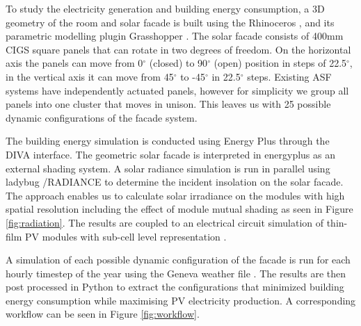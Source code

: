 
To study the electricity generation and building energy consumption, a 3D geometry of the room and solar facade is built using the Rhinoceros \cite{Rhino}, and its parametric modelling plugin Grasshopper \cite{grasshopper}. The solar facade consists of 400mm CIGS square panels that can rotate in two degrees of freedom. On the horizontal axis the panels can move from 0$^{\circ}$ (closed) to 90$^{\circ}$ (open) position in steps of 22.5$^{\circ}$, in the vertical axis it can move from 45$^{\circ}$ to -45$^{\circ}$ in 22.5$^{\circ}$ steps. Existing ASF systems \cite{nagy2015frontiers} have independently actuated panels, however for simplicity we group all panels into one cluster that moves in unison. This leaves us with 25 possible dynamic configurations of the facade system. 

The building energy simulation is conducted using Energy Plus \cite{energyplus} through the DIVA \cite{DIVA} interface. The geometric solar facade is interpreted in energyplus as an external shading system. A solar radiance simulation is run in parallel using ladybug \cite{roudsari2014ladybug} /RADIANCE \cite{ward1994radiance} to determine the incident insolation on the solar facade. The approach enables us to calculate solar irradiance on the modules with high spatial resolution including the effect of module mutual shading as seen in Figure \ref{fig:radiation}. The results are coupled to an electrical circuit simulation of thin-film PV modules with sub-cell level representation \cite{hofer2015PVSEC}.

A simulation of each possible dynamic configuration of the facade is run for each hourly timestep of the year using the Geneva weather file \cite{genevaweatherfile}. The results are then post processed in Python \cite{python} to extract the configurations that minimized building energy consumption while maximising PV electricity production. A corresponding workflow can be seen in Figure \ref{fig:workflow}. 




